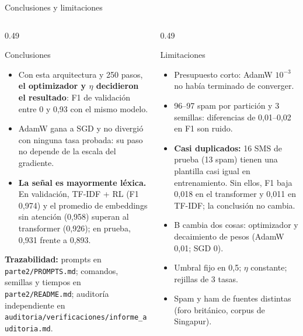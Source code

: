 \documentclass[aspectratio=169, 10pt]{beamer}
\begin{document}
\begin{frame}{Conclusiones y limitaciones}
  \small
  \begin{columns}[T]
    \begin{column}{0.49\textwidth}
      \begin{block}{Conclusiones}
        \begin{itemize}
          \item Con esta arquitectura y 250 pasos, \textbf{el optimizador y $\eta$ decidieron el
                resultado}: F1 de validación entre 0 y 0,93 con el mismo modelo.
          \item AdamW gana a SGD y no divergió con ninguna tasa probada: su paso no depende de la
                escala del gradiente.
          \item \textbf{La señal es mayormente léxica.} En validación, TF-IDF + RL (F1 0,974) y el
                promedio de embeddings sin atención (0,958) superan al transformer (0,926); en
                prueba, 0,931 frente a 0,893.
        \end{itemize}
      \end{block}
      \vspace{0.1cm}
      {\scriptsize\textbf{Trazabilidad:} prompts en \texttt{parte2/PROMPTS.md}; comandos, semillas y
       tiempos en \texttt{parte2/README.md}; auditoría independiente en
       \texttt{auditoria/verificaciones/informe\_auditoria.md}.}
    \end{column}
    \begin{column}{0.49\textwidth}
      \begin{alertblock}{Limitaciones}
        \begin{itemize}
          \item Presupuesto corto: AdamW $10^{-3}$ no había terminado de converger.
          \item 96--97 spam por partición y 3 semillas: diferencias de 0,01--0,02 en F1 son ruido.
          \item \textbf{Casi duplicados:} 16 SMS de prueba (13 spam) tienen una plantilla casi igual
                en entrenamiento. Sin ellos, F1 baja 0,018 en el transformer y 0,011 en TF-IDF; la
                conclusión no cambia.
          \item B cambia dos cosas: optimizador y decaimiento de pesos (AdamW 0,01; SGD 0).
          \item Umbral fijo en 0,5; $\eta$ constante; rejillas de 3 tasas.
          \item Spam y ham de fuentes distintas (foro británico, corpus de Singapur).
        \end{itemize}
      \end{alertblock}
    \end{column}
  \end{columns}
\end{frame}
\end{document}
